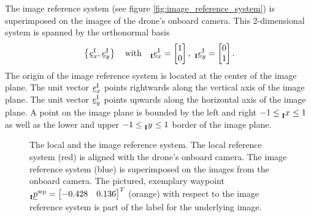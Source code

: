The image reference system (see figure \ref{fig:image_reference_system}) 
is superimposed on the images of the drone's onboard camera.
This 2-dimensional system is spanned by the orthonormal basis
\begin{equation}
    \left\{
        \unitvec[]{\text I}{x}{}{},
        \unitvec[]{\text I}{y}{}{}
    \right\}
    \quad \text{with} \quad 
    \unitvec[]{\text I}{x}{\irs}{} = \begin{bmatrix} 1 \\ 0 \end{bmatrix},\ 
    \unitvec[]{\text I}{y}{\irs}{} = \begin{bmatrix} 0 \\ 1 \end{bmatrix}.
\end{equation}
The origin of the image reference system 
is located at the center of the image plane.
The unit vector 
$\unitvec[]{\text I}{x}{}{}$  
points rightwards along the vertical axis of the image plane.
The unit vector 
$\unitvec[]{\text I}{y}{}{}$  
points upwards along the horizontal axis of the image plane.
A point on the image plane 
is bounded by the left and right
$ -1 \le \x[]{}{}{\irs}{} \le 1 $
as well as the lower and upper
$ -1 \le \y[]{}{}{\irs}{} \le 1 $
border of the image plane.
\begin{figure}[h]
    \centering
    \caption[
        The local and the image reference system
    ]{
        The local and the image reference system. 
        The local reference system (red) is aligned with the drone's onboard camera. 
        The image reference system (blue) is superimposed on the images from the onboard camera.
        The pictured, exemplary waypoint
        $\pos[]{\wayp}{}{\irs}{} = \begin{bmatrix} -0.428 & 0.136 \end{bmatrix}^T$
        (orange) with respect to the image reference system
        is part of the label for the underlying image.
        \label{fig:local_and_image_reference_system}
    }
\end{figure}





